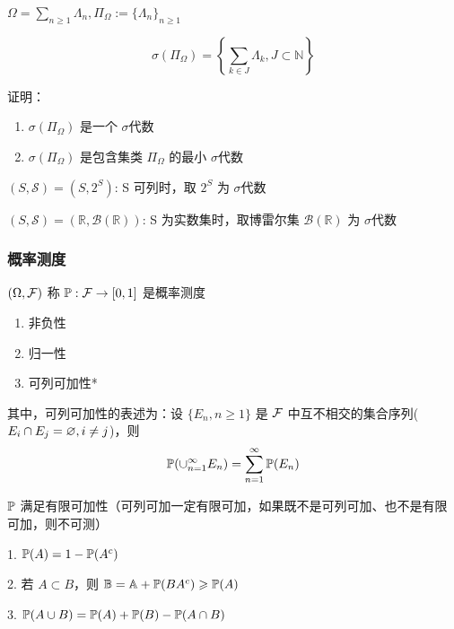 \begin{example}
    $\Omega=\sum_{n\geq 1}\Lambda_n, \Pi_{\Omega}:=\{\Lambda_n\}_{n\geq 1}$

    \[
    \sigma(\Pi_{\Omega})=\left \{\sum_{k\in J}\Lambda_k, J\subset \mathbb{N}\right \}
    \]
\end{example}

\begin{problem}[作业1-1]
    证明：\begin{enumerate}
        \item $\sigma(\Pi_{\Omega})$ 是一个 $\sigma$代数
        \item $\sigma(\Pi_{\Omega})$ 是包含集类 $\Pi_{\Omega}$ 的最小 $\sigma$代数
    \end{enumerate}
\end{problem}


$(S,\mathcal{S})=(S,2^S)$: S 可列时，取 $2^S$ 为 $\sigma$代数

$(S,\mathcal{S})=(\mathbb{R},\mathcal{B}(\mathbb{R}))$: S 为实数集时，取博雷尔集 $\mathcal{B}(\mathbb{R})$ 为 $\sigma$代数


\subsubsection{概率测度}

\begin{definition}[概率测度]\label{def:prob_measure}
    $(\Omega, \mathcal{F})$ 称 $\mathbb{P}: \mathcal{F}\rightarrow [0,1]$ 是概率测度
    \begin{enumerate}
        \item 非负性
        \item 归一性
        \item 可列可加性*
    \end{enumerate}
    其中，可列可加性的表述为：设 $\{E_n, n\geq 1\}$ 是 $\mathcal{F}$ 中互不相交的集合序列($E_i\cap E_j=\varnothing, i\neq j$)，则
    \[
    \mathbb{P}(\cup_{n=1}^{\infty}E_n)=\sum_{n=1}^{\infty}\mathbb{P}(E_n)
    \]
\end{definition}

\begin{property}
$\mathbb{P}$ 满足有限可加性（可列可加一定有限可加，如果既不是可列可加、也不是有限可加，则不可测）
\end{property}

\begin{corollary}\label{cor:set_operation}
    1. $\mathbb{P}(A)=1-\mathbb{P}(A^c)$

    2. 若 $A\subset B$，则 $\mathbb{B}=\mathbb{A}+\mathbb{P}(BA^c)\geqslant \mathbb{P}(A)$

    3. $\mathbb{P}(A\cup B)=\mathbb{P}(A)+\mathbb{P}(B)-\mathbb{P}(A\cap B)$
\end{corollary}

